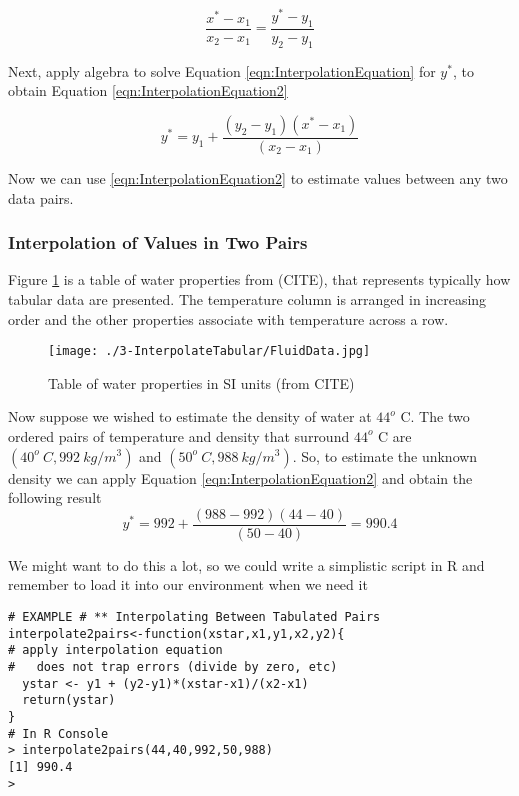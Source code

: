 \begin{equation}
\frac{x^*-x_1}{x_2-x_1}=\frac{y^*-y_1}{y_2-y_1}
\label{eqn:InterpolationEquation}
\end{equation}

Next, apply algebra to solve Equation \ref{eqn:InterpolationEquation} for $y^*$, to obtain Equation \ref{eqn:InterpolationEquation2}

\begin{equation}
y^*=y_1+\frac{(y_2-y_1)(x^*-x_1)}{(x_2-x_1)}
\label{eqn:InterpolationEquation2}
\end{equation}

Now we can use \ref{eqn:InterpolationEquation2} to estimate values between any two data pairs.\\

\subsubsection{Interpolation of Values in Two Pairs}

Figure \ref{fig:FluidData} is a table of water properties from (CITE), that represents typically how tabular data are presented.  The temperature column is arranged in increasing order and the other properties associate with temperature across a row.

\begin{figure}[htbp] %
   \centering
   \texttt{[image: ./3-InterpolateTabular/FluidData.jpg]} 
   \caption{Table of water properties in SI units (from CITE)}
   \label{fig:FluidData}
\end{figure}

Now suppose we wished to estimate the density of water at $44^o$ C.  
The two ordered pairs of temperature and density that surround $44^o$ C are $(40^o~C,992~kg/m^3)$ and $(50^o~C,988~kg/m^3)$.
So, to estimate the unknown density we can apply Equation \ref{eqn:InterpolationEquation2} and obtain the following result
\begin{equation}
y^*=992+\frac{(988-992)(44-40)}{(50-40)}=990.4
\label{eqn:DensityInterpolation}
\end{equation}

We might want to do this a lot, so we could write a simplistic script in R and remember to load it into our environment when we need it

\begin{lstlisting}[caption=R code demonstrating the interpolation equation, label=lst:InterpolatePairs]
# EXAMPLE # ** Interpolating Between Tabulated Pairs
interpolate2pairs<-function(xstar,x1,y1,x2,y2){
# apply interpolation equation
#   does not trap errors (divide by zero, etc)
  ystar <- y1 + (y2-y1)*(xstar-x1)/(x2-x1)
  return(ystar)
}
# In R Console
> interpolate2pairs(44,40,992,50,988)
[1] 990.4
> 
\end{lstlisting}   

